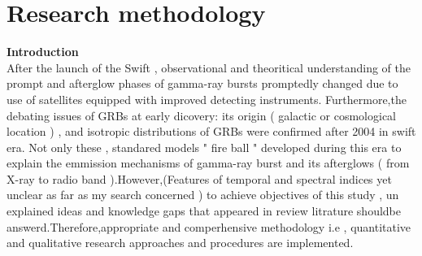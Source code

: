 \setcounter{chapter}{2}
\chapter{Research methodology}
\label{chap:3}
\textbf{Introduction}\\
After the launch of the Swift , observational and theoritical understanding of the  prompt and afterglow phases of gamma-ray bursts promptedly changed due to use of satellites equipped with improved detecting instruments. Furthermore,the debating issues of GRBs at early dicovery: its origin ( galactic or cosmological location ) , and isotropic distributions of GRBs were confirmed after 2004 in swift era. Not only these , standared models " fire ball  " developed  during this era to explain the emmission mechanisms of gamma-ray burst and its afterglows ( from X-ray to radio band ).However,(Features of temporal and spectral indices yet unclear as far as my search concerned  ) to achieve objectives of this study , un explained ideas and knowledge gaps that appeared in review litrature shouldbe answerd.Therefore,appropriate and  comperhensive methodology i.e , quantitative and qualitative research approaches and procedures are implemented.  
